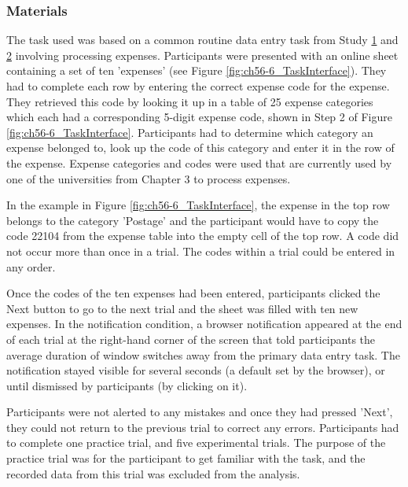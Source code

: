 \subsubsection{Materials}
The task used was based on a common routine data entry task from Study \hyperref[st:Study1]{1} and \hyperref[st:Study2]{2} involving processing expenses. Participants were presented with an online sheet containing a set of ten 'expenses' (see Figure \ref{fig:ch56-6_TaskInterface}). They had to complete each row by entering the correct expense code for the expense. They retrieved this code by looking it up in a table of 25 expense categories which each had a corresponding 5-digit expense code, shown in Step 2 of Figure \ref{fig:ch56-6_TaskInterface}. Participants had to determine which category an expense belonged to, look up the code of this category and enter it in the row of the expense.  Expense categories and codes were used that are currently used by one of the  universities from Chapter 3 to process expenses.

In the example in Figure \ref{fig:ch56-6_TaskInterface}, the expense in the top row belongs to the category 'Postage' and the participant would have to copy the code 22104 from the expense table into the empty cell of the top row. A code did not occur more than once in a trial. The codes within a trial could be entered in any order. 

Once the codes of the ten expenses had been entered, participants clicked the Next button to go to the next trial and the sheet was filled with ten new expenses. In the notification condition, a browser notification appeared at the end of each trial at the right-hand corner of the screen that told participants the average duration of window switches away from the primary data entry task. The notification stayed visible for several seconds (a default set by the browser), or until dismissed by participants (by clicking on it). 

Participants were not alerted to any mistakes and once they had pressed 'Next', they could not return to the previous trial to correct any errors. Participants had to complete one practice trial, and five experimental trials. The purpose of the practice trial was for the participant to get familiar with the task, and the recorded data from this trial was excluded from the analysis.

